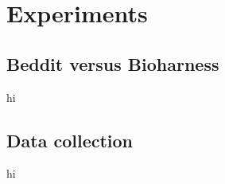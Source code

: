\section{Experiments}
	\subsection{Beddit versus Bioharness}
		hi
	\subsection{Data collection}
		hi
